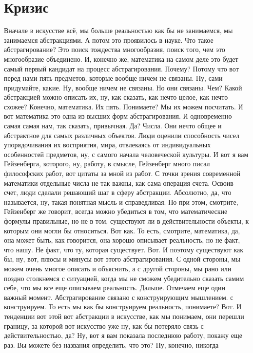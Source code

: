 \section{Кризис}
Вначале в искусстве всё, мы больше реальностью как бы не
занимаемся, мы занимаемся абстракциями. А потом это проявилось в науке. Что
такое абстрагирование? Это поиск тождества многообразия, поиск того, чем это
многообразие объединено. И, конечно же, математика на самом деле это будет самый
первый кандидат на процесс абстрагирования. Почему? Потому что вот перед нами
пять предметов, которые вообще ничем не связаны. Ну, сами придумайте, какие. Ну,
вообще ничем не связаны. Но они связаны. Чем? Какой абстракцией можно описать
их, ну, как сказать, как нечто целое, как нечто схожее? Конечно, математика. Их
пять. Понимаете? Мы их можем посчитать. И вот математика это одна из высших форм
абстрагирования. И одновременно самая самая нам, так сказать, привычная. Да?
Числа. Они нечто общее и абстрактное для самых различных объектов. Люди оценили
способность чисел упорядочивания их восприятия, мира, отвлекаясь от
индивидуальных особенностей предметов, ну, с самого начала человеческой
культуры. И вот я вам Гейзенберга, которого, ну, работу, в смысле, Гейзенберг
много писал философских работ, вот цитаты за мной из работ. С точки зрения
современной математики отдельные числа не так важны, как сама операция счета.
Освоив счет, люди сделали решающий шаг в сферу абстракции. Абсолютно, да, что
называется, ну, такая понятная мысль и справедливая. Но при этом, смотрите,
Гейзенберг же говорит, всегда можно убедиться в том, что математические формулы
правильные, но не в том, существуют ли в действительности объекты, к которым они
могли бы относиться. Вот как. То есть, смотрите, математика, да, она может быть,
как говорится, она хорошо описывает реальность, но не факт, что нашу. Не факт,
что ту, которая существует. Вот. И поэтому существуют как бы, ну, вот, плюсы и
минусы вот этого абстрагирования. С одной стороны, мы можем очень многое описать
и объяснить, а с другой стороны, мы рано или поздно столкнемся с ситуацией,
когда мы не сможем убедительно сказать самим себе, что мы все еще описываем
реальность. Дальше. Отмечаем еще один важный момент. Абстрагирование связано с
конструирующим мышлением. с конструируем. То есть мы как бы конструируем
реальность, понимаете? Вот. И тенденции вот этой вот абстракции в искусстве, как
мы понимаем, они перешли границу, за которой вот искусство уже ну, как бы
потеряло связь с действительностью, да? Ну, вот я вам показала последнюю работу,
покажу еще раз. Вы можете без названия определить, что это? Ну, конечно, никогда
